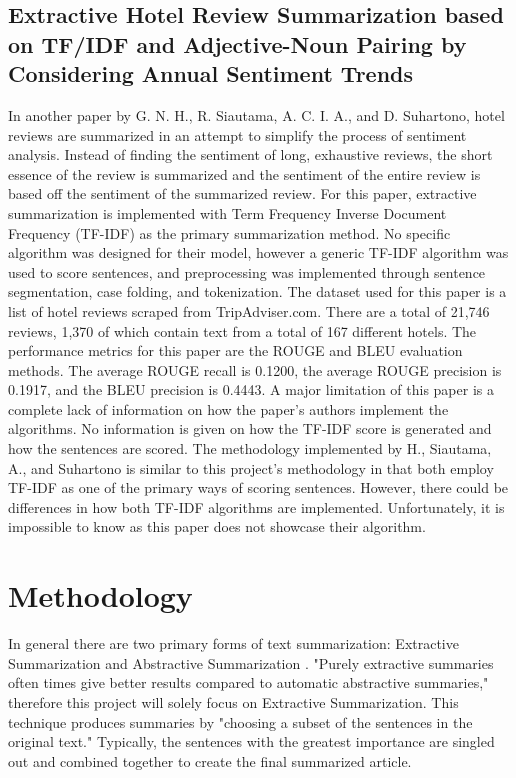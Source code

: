 \documentclass{IEEEtran}
\begin{document}
\subsection{Extractive Hotel Review Summarization based on TF/IDF and Adjective-Noun Pairing by Considering Annual Sentiment Trends \cite{related_work_2}}
In another paper by G. N. H., R. Siautama, A. C. I. A., and D. Suhartono, hotel reviews are summarized in an attempt to simplify the process of sentiment analysis. Instead of finding the sentiment of long, exhaustive reviews, the short essence of the review is summarized and the sentiment of the entire review is based off the sentiment of the summarized review. For this paper, extractive summarization is implemented with Term Frequency Inverse Document Frequency (TF-IDF) as the primary summarization method. No specific algorithm was designed for their model, however a generic TF-IDF algorithm was used to score sentences, and preprocessing was implemented through sentence segmentation, case folding, and tokenization. The dataset used for this paper is a list of hotel reviews scraped from TripAdviser.com. There are a total of 21,746 reviews, 1,370 of which contain text from a total of 167 different hotels. The performance metrics for this paper are the ROUGE and BLEU evaluation methods. The average ROUGE recall is 0.1200, the average ROUGE precision is 0.1917, and the BLEU precision is 0.4443. A major limitation of this paper is a complete lack of information on how the paper’s authors implement the algorithms. No information is given on how the TF-IDF score is generated and how the sentences are scored. The methodology implemented by H., Siautama, A., and Suhartono is similar to this project's methodology in that both employ TF-IDF as one of the primary ways of scoring sentences. However, there could be differences in how both TF-IDF algorithms are implemented. Unfortunately, it is impossible to know as this paper does not showcase their algorithm.

\section{Methodology}
In general there are two primary forms of text summarization: Extractive Summarization and Abstractive Summarization \cite{related_summarization}.  "Purely extractive summaries often times give better results compared to automatic abstractive summaries," \cite{related_summarization} therefore this project will solely focus on Extractive Summarization. This technique produces summaries by "choosing a subset of the sentences in the original text." \cite{related_summarization} Typically, the sentences with the greatest importance are singled out and combined together to create the final summarized article. \cite{related_summarization}
\end{document}
